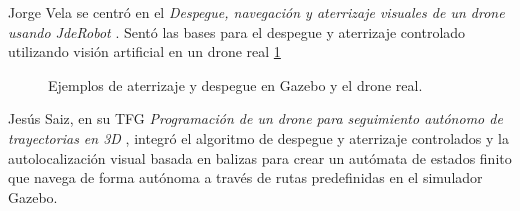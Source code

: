 Jorge Vela se centró en el \textit{Despegue, navegación y aterrizaje visuales de un drone usando JdeRobot} \cite{JorgeVela}. Sentó las bases para el despegue y aterrizaje controlado utilizando visión artificial en un drone real \ref{FIG:despgueyaterrizaje}

\begin{figure}[hbtp]
	\centering
	\hspace{2mm}
	\caption{Ejemplos de aterrizaje y despegue en Gazebo y el drone real.}	
	\label{FIG:despgueyaterrizaje}
\end{figure}

Jesús Saiz, en su TFG \textit{Programación de un drone para seguimiento autónomo de trayectorias en 3D} \cite{JesusSaiz}, integró el algoritmo de despegue y aterrizaje controlados y la autolocalización visual basada en balizas para crear un autómata de estados finito que navega de forma autónoma a través de rutas predefinidas en el simulador Gazebo. 

